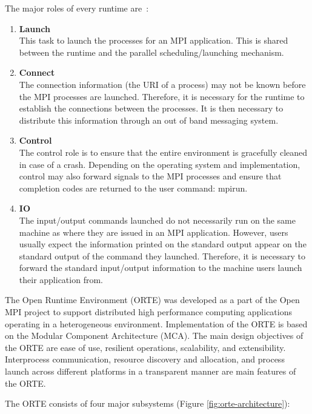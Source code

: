 The major roles of every runtime are~\cite{bosilca2011scalability}:
\begin{enumerate}
\item \textbf{Launch}\\
  This task to launch the processes for an MPI application. This is shared between the runtime and the parallel scheduling/launching mechanism.
\item \textbf{Connect}\\
  The connection information (the URI of a process) may not be known before the MPI processes are launched. Therefore, it is necessary for the runtime to establish the connections between the processes.  It is then necessary to distribute this information through an out of band messaging system. 
\item \textbf{Control}\\
  The control role is to ensure that the entire environment is gracefully cleaned in case of a crash. Depending on the operating system and implementation, control may also forward signals to the MPI processes and ensure that completion codes
are returned to the user command: mpirun.
\item \textbf{IO}\\
  The input/output commands launched do not necessarily run on the same machine as where they are issued in an MPI application. However, users usually expect the information printed on the standard output appear on the standard output of the command they launched.  Therefore, it is necessary to forward the standard input/output information to the machine users launch their application from. 
\end{enumerate}

The Open Runtime Environment (ORTE) was developed as a part of the Open MPI project to support distributed high performance computing applications operating in a heterogeneous environment. Implementation of the ORTE is based on the Modular Component Architecture (MCA). The main design objectives of the ORTE are ease of use, resilient operations, scalability, and extensibility. Interprocess communication, resource discovery and allocation, and process launch across different platforms in a transparent manner are main features of the ORTE\cite{castain2005open,hpcwire}.

The ORTE consists of four major subsystems (Figure \ref{fig:orte-architecture})\cite{castain2005open,castain2008open,Castain2008153}:

